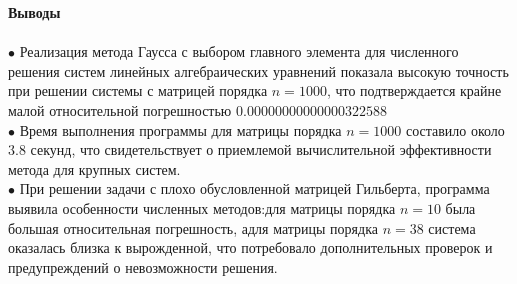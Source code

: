 \documentclass[a4paper, 12pt]{report}
\begin{document}
    \newpage
   \textbf{\Huge{Выводы}}\\\\
   $\bullet$ Реализация метода Гаусса с выбором главного элемента для численного решения систем линейных алгебраических уравнений показала высокую точность при решении системы с матрицей порядка $n = 1000$, что подтверждается крайне малой относительной погрешностью $0.00000000000000322588$\\
   $\bullet$ Время выполнения программы для матрицы порядка $n = 1000$ составило около $3.8$ секунд, что свидетельствует о приемлемой вычислительной эффективности метода для крупных систем.\\
   $\bullet$ При решении задачи с плохо обусловленной матрицей Гильберта, программа выявила особенности численных методов:для матрицы порядка $n = 10$ была большая относительная погрешность, адля матрицы порядка $n = 38$ система оказалась близка к вырожденной, что потребовало дополнительных проверок и предупреждений о невозможности решения.\\
   
\end{document}
